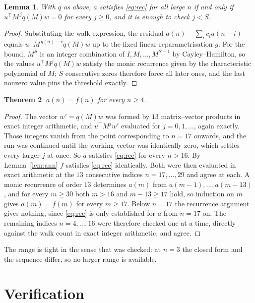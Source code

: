 \documentclass[11pt,a4paper]{article}
\theoremstyle{plain}
\newtheorem{theorem}{Theorem}
\newtheorem{lemma}[theorem]{Lemma}
\theoremstyle{definition}
\begin{document}
\begin{lemma}\label{lem:crit}
With $q$ as above, $a$ satisfies \eqref{eq:rec} for all large $n$ if and only if
$u^{\!\top}M^{\,j}q(M)w=0$ for every $j\ge0$, and it is enough to check $j<S$.
\end{lemma}

\begin{proof}
Substituting the walk expression, the residual $a(n)-\sum_ic_ia(n-i)$ equals
$u^{\!\top}M^{\,g(n)-r}q(M)w$ up to the fixed linear reparametrisation $g$. For the bound,
$M^{S}$ is an integer combination of $I,M,\dots,M^{S-1}$ by Cayley--Hamilton, so the values
$u^{\!\top}M^{j}q(M)w$ satisfy the monic recurrence given by the characteristic polynomial of
$M$; $S$ consecutive zeros therefore force all later ones, and the last nonzero value pins the
threshold exactly.
\end{proof}

\begin{theorem}
$a(n)=f(n)$ for every $n\ge4$.
\end{theorem}

\begin{proof}
The vector $w'=q(M)w$ was formed by $13$ matrix--vector products in exact integer
arithmetic, and $u^{\!\top}M^{j}w'$ evaluated for $j=0,1,\dots$, again exactly. Those integers
vanish from the point corresponding to $n=17$ onwards, and the run was continued until the
working vector was identically zero, which settles every larger $j$ at once. So $a$ satisfies
\eqref{eq:rec} for every $n>16$. By Lemma~\ref{lem:ann} $f$ satisfies \eqref{eq:rec}
identically. Both were then evaluated in exact arithmetic at the $13$ consecutive indices
$n=17,\dots,29$ and agree at each. A monic recurrence of order $13$
determines $a(m)$ from $a(m-1),\dots,a(m-13)$, and for every $m\ge30$ both
$m>16$ and $m-13\ge17$ hold, so induction on $m$ gives $a(m)=f(m)$ for every
$m\ge17$.
Below $n=17$ the recurrence argument gives nothing, since \eqref{eq:rec} is only
established for $a$ from $n=17$ on. The remaining indices $n=4,\dots,16$ were
therefore checked one at a time, directly against the walk count in exact integer arithmetic,
and agree.
\end{proof}

The range is tight in the sense that was checked: at $n=3$ the closed form and the sequence differ, so no larger range is available.

\section{Verification}
\end{document}
